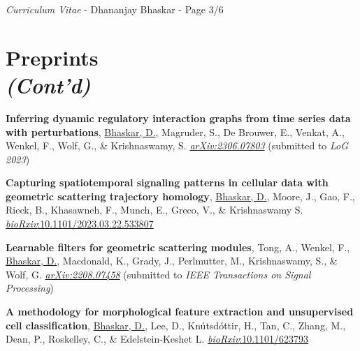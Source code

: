 \documentclass[margin,line]{res}
\begin{document}
\begin{resume}

\newpage
\begin{flushright}
\textit{Curriculum Vitae} - Dhananjay Bhaskar - Page 3/6
\end{flushright}
\vspace*{.02cm}

\section{\sc Preprints\\ \textit{(Cont'd)}}
{
\renewcommand\leftmargini{0em}
\renewcommand{\labelenumi}{P\theenumi}
\begin{etaremune}[start=4]
\vspace*{.1cm}
\item{\bf Inferring dynamic regulatory interaction graphs from time series data with perturbations},
\underline{Bhaskar, D.}, Magruder, S., De Brouwer, E., Venkat, A., Wenkel, F., Wolf, G., \& Krishnaswamy, S.
\href{https://arxiv.org/abs/2306.07803}{\textit{arXiv:2306.07803}} (submitted to \textit{LoG 2023})
\vspace*{.1cm}
\item{\bf Capturing spatiotemporal signaling patterns in cellular data with geometric scattering trajectory homology},
\underline{Bhaskar, D.}, Moore, J., Gao, F., Rieck, B., Khasawneh, F., Munch, E., Greco, V., \& Krishnaswamy S.
\href{https://doi.org/10.1101/2023.03.22.533807}{\textit{bioRxiv}:10.1101/2023.03.22.533807}
\vspace*{.1cm}
\item{\bf Learnable filters for geometric scattering modules},
Tong, A., Wenkel, F., \underline{Bhaskar, D.}, Macdonald, K., Grady, J., Perlmutter, M., Krishnaswamy, S., \& Wolf, G.
\href{https://arxiv.org/abs/2208.07458}{\textit{arXiv:2208.07458}} (submitted to \textit{IEEE Transactions on Signal Processing})
\vspace*{.1cm}
\item{\bf A methodology for morphological feature extraction and unsupervised cell classification},
\underline{Bhaskar, D.}, Lee, D., Kn\'{u}tsd\'{o}ttir, H., Tan, C., Zhang, M., Dean, P., Roskelley, C., \& Edelstein-Keshet L.
\href{https://www.biorxiv.org/content/10.1101/623793v1.abstract}{\textit{bioRxiv}:10.1101/623793}
\end{etaremune}
}


\end{resume}
\end{document}
